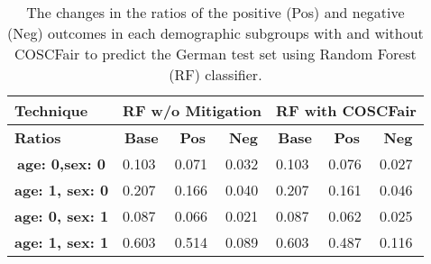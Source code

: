 
\begin{table}[h!]

\begin{tabular}{|c|l|l|l|l|l|l|}
\hline
\multicolumn{1}{|l|}{\textbf{Technique}} & \multicolumn{3}{c|}{\textbf{RF w/o Mitigation}}                                                            & \multicolumn{3}{c|}{\textbf{RF with COSCFair}}                                                             \\ \hline
\multicolumn{1}{|l|}{\textbf{Ratios}}    & \multicolumn{1}{c|}{\textbf{Base}} & \multicolumn{1}{c|}{\textbf{Pos}} & \multicolumn{1}{c|}{\textbf{Neg}} & \multicolumn{1}{c|}{\textbf{Base}} & \multicolumn{1}{c|}{\textbf{Pos}} & \multicolumn{1}{c|}{\textbf{Neg}} \\ \hline
\textbf{age: 0,sex: 0}                   & 0.103                              & 0.071                             & 0.032                             & 0.103                              & 0.076                             & 0.027                             \\ \hline
\textbf{age: 1, sex: 0}                  & 0.207                              & 0.166                             & 0.040                             & 0.207                              & 0.161                             & 0.046                             \\ \hline
\textbf{age: 0, sex: 1}                  & 0.087                              & 0.066                             & 0.021                             & 0.087                              & 0.062                             & 0.025                             \\ \hline
\textbf{age: 1, sex: 1}                  & 0.603                              & 0.514                             & 0.089                             & 0.603                              & 0.487                             & 0.116                             \\ \hline
\end{tabular}

\caption{\label{Table6} The changes in the ratios of the positive (Pos) and negative (Neg) outcomes in each demographic subgroups with and without COSCFair to predict the German test set using Random Forest (RF) classifier.}
\vskip -0.1in
\end{table}
